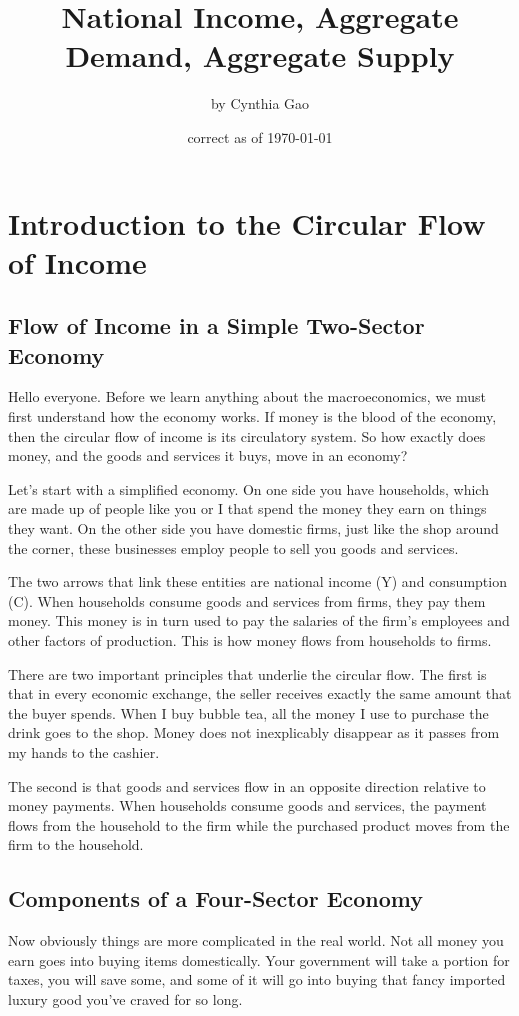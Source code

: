 \RequirePackage{../../dominatrix}

\title{National Income, Aggregate Demand, Aggregate Supply}
\author{\large by Cynthia Gao}
\date{\small correct as of \today}

\maketitle
\tableofcontents
\section{Introduction to the Circular Flow of Income}
\subsection{Flow of Income in a Simple Two-Sector Economy}
Hello everyone. Before we learn anything about the macroeconomics, we must first understand how the economy works. If money is the blood of the economy, then the circular flow of income is its circulatory system. So how exactly does money, and the goods and services it buys, move in an economy?

Let’s start with a simplified economy. On one side you have households, which are made up of people like you or I that spend the money they earn on things they want. On the other side you have domestic firms, just like the shop around the corner, these businesses employ people to sell you goods and services. 

The two arrows that link these entities are national income (Y) and consumption (C). When households consume goods and services from firms, they pay them money. This money is in turn used to pay the salaries of the firm’s employees and other factors of production. This is how money flows from households to firms.

There are two important principles that underlie the circular flow. The first is that in every economic exchange, the seller receives exactly the same amount that the buyer spends. When I buy bubble tea, all the money I use to purchase the drink goes to the shop. Money does not inexplicably disappear as it passes from my hands to the cashier. 

The second is that goods and services flow in an opposite direction relative to money payments. When households consume goods and services, the payment flows from the household to the firm while the purchased product moves from the firm to the household.
\subsection{Components of a Four-Sector Economy}
Now obviously things are more complicated in the real world. Not all money you earn goes into buying items domestically. Your government will take a portion for taxes, you will save some, and some of it will go into buying that fancy imported luxury good you’ve craved for so long. 

